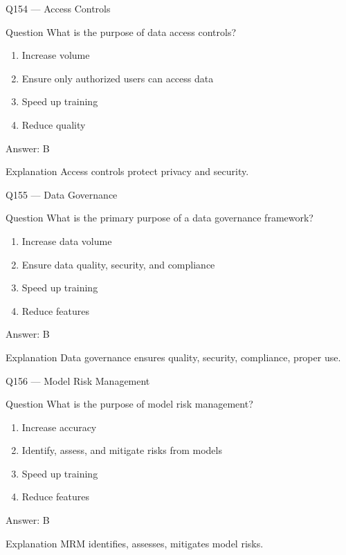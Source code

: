 \documentclass[aspectratio=169,8pt]{beamer}
\begin{document}
	\begin{frame}{Q154 --- Access Controls}
		\begin{block}{Question}
			What is the purpose of data access controls?
		\end{block}
		\begin{enumerate}
			\item Increase volume
			\item Ensure only authorized users can access data
			\item Speed up training
			\item Reduce quality
		\end{enumerate}
		\begin{exampleblock}{Answer: B}\end{exampleblock}
		\begin{block}{Explanation}
			Access controls protect privacy and security.
		\end{block}
	\end{frame}
	
	\begin{frame}{Q155 --- Data Governance}
		\begin{block}{Question}
			What is the primary purpose of a data governance framework?
		\end{block}
		\begin{enumerate}
			\item Increase data volume
			\item Ensure data quality, security, and compliance
			\item Speed up training
			\item Reduce features
		\end{enumerate}
		\begin{exampleblock}{Answer: B}\end{exampleblock}
		\begin{block}{Explanation}
			Data governance ensures quality, security, compliance, proper use.
		\end{block}
	\end{frame}
	
	\begin{frame}{Q156 --- Model Risk Management}
		\begin{block}{Question}
			What is the purpose of model risk management?
		\end{block}
		\begin{enumerate}
			\item Increase accuracy
			\item Identify, assess, and mitigate risks from models
			\item Speed up training
			\item Reduce features
		\end{enumerate}
		\begin{exampleblock}{Answer: B}\end{exampleblock}
		\begin{block}{Explanation}
			MRM identifies, assesses, mitigates model risks.
		\end{block}
	\end{frame}
	
\end{document}
